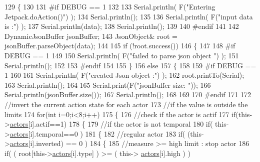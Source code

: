 \begin{DoxyCode}
129 \{
130 
131 \textcolor{preprocessor}{#if DEBUG == 1 }
132 
133     Serial.println( F(\textcolor{stringliteral}{"Entering Jetpack.doAction()"}) );
134     Serial.println();
135 
136     Serial.println( F(\textcolor{stringliteral}{"input data is :"}) );
137     Serial.println(data);
138     Serial.println();
139 
140 \textcolor{preprocessor}{#endif }
141 
142     DynamicJsonBuffer jsonBuffer;
143     JsonObject& root = jsonBuffer.parseObject(data);
144     
145     \textcolor{keywordflow}{if} (!root.success()) 
146     \{
147     
148 \textcolor{preprocessor}{    #if DEBUG == 1 }
149 
150         Serial.println( F(\textcolor{stringliteral}{"failed to parse json object "}) );
151         Serial.println();
152     
153 \textcolor{preprocessor}{    #endif }
154 
155     \}
156     \textcolor{keywordflow}{else}
157     \{
158     
159 \textcolor{preprocessor}{    #if DEBUG == 1 }
160 
161         Serial.println( F(\textcolor{stringliteral}{"created Json object :"}) );
162         root.printTo(Serial);
163         Serial.println();
164 
165         Serial.print(F(\textcolor{stringliteral}{"jsonBuffer size: "}));
166         Serial.println(jsonBuffer.size());
167         Serial.println();
168 
169     
170 \textcolor{preprocessor}{    #endif }
171 
172         \textcolor{comment}{//invert the current action state for each actor}
173         \textcolor{comment}{//if the value is outside the limits}
174         \textcolor{keywordflow}{for}(\textcolor{keywordtype}{int} i=0;i<8;i++)
175         \{
176             \textcolor{comment}{//check if the actor is actif }
177             \textcolor{keywordflow}{if}(this->\hyperlink{class_jetpack_a7e16d2f97837f9712a2e6de1c50d99db}{actors}[i].actif==1)
178             \{   
179                 \textcolor{comment}{//if the actor is not temporal}
180                 \textcolor{keywordflow}{if}( this->\hyperlink{class_jetpack_a7e16d2f97837f9712a2e6de1c50d99db}{actors}[i].temporal==0 ) 
181                 \{   
182                     \textcolor{comment}{//regular actor}
183                     \textcolor{keywordflow}{if}( (this->\hyperlink{class_jetpack_a7e16d2f97837f9712a2e6de1c50d99db}{actors}[i].inverted) == 0 )
184                     \{
185                         \textcolor{comment}{//measure >= high limit : stop actor}
186                         \textcolor{keywordflow}{if}( ( root[this->\hyperlink{class_jetpack_a7e16d2f97837f9712a2e6de1c50d99db}{actors}[i].type] ) >= ( this->
      \hyperlink{class_jetpack_a7e16d2f97837f9712a2e6de1c50d99db}{actors}[i].high ) )    

\end{DoxyCode}
